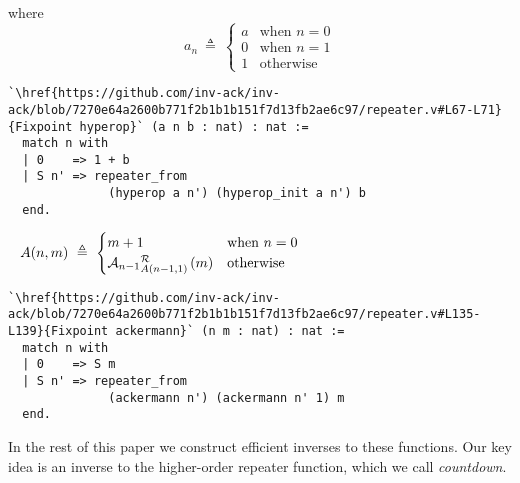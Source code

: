 where
\begin{equation*}
a_n ~ \triangleq ~ \begin{cases}
a & \text{when } n = 0 \\
0 & \text{when } n = 1 \\
1 & \text{otherwise}
\end{cases}
\end{equation*}
\begin{lstlisting} 
`\href{https://github.com/inv-ack/inv-ack/blob/7270e64a2600b771f2b1b1b151f7d13fb2ae6c97/repeater.v#L67-L71}{Fixpoint hyperop}` (a n b : nat) : nat :=
  match n with
  | 0    => 1 + b
  | S n' => repeater_from
              (hyperop a n') (hyperop_init a n') b
  end.
\end{lstlisting}
\begin{equation*}
A(n,m) ~ \triangleq ~ \begin{cases}
m + 1 & \text{when } n = 0 \\
\rf{\mathcal{A}_{n-1}}{A(n-1,1)\ }(m) & \text{otherwise}
\end{cases} \qquad \qquad \qquad \qquad \qquad \qquad \qquad ~ 
\end{equation*}
\begin{lstlisting}
`\href{https://github.com/inv-ack/inv-ack/blob/7270e64a2600b771f2b1b1b151f7d13fb2ae6c97/repeater.v#L135-L139}{Fixpoint ackermann}` (n m : nat) : nat :=
  match n with
  | 0    => S m
  | S n' => repeater_from
              (ackermann n') (ackermann n' 1) m
  end.
\end{lstlisting}
In the rest of this paper we construct efficient inverses to these
functions.  Our key idea is an inverse to the higher-order repeater function, which we call \emph{countdown}.









